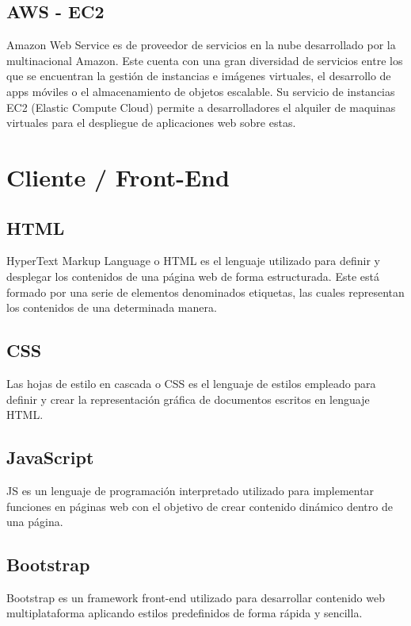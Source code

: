 \subsection{AWS - EC2}
Amazon Web Service\cite{tool:AWS} es de proveedor de servicios en la nube desarrollado por la multinacional Amazon. Este cuenta con una gran diversidad de servicios entre los que se encuentran la gestión de instancias e imágenes virtuales, el desarrollo de apps móviles o el almacenamiento de objetos escalable. Su servicio de instancias EC2 (Elastic Compute Cloud) permite a desarrolladores el alquiler de maquinas virtuales para el despliegue de aplicaciones web sobre estas.

\section{Cliente / Front-End}

\subsection{HTML}
HyperText Markup Language o HTML\cite{tool:HTML} es el lenguaje utilizado para definir y desplegar los contenidos de una página web de forma estructurada. Este está formado por una serie de elementos denominados etiquetas, las cuales representan los contenidos de una determinada manera.

\subsection{CSS}
Las hojas de estilo en cascada o CSS\cite{tool:CSS} es el lenguaje de estilos empleado para definir y crear la representación gráfica de documentos escritos en lenguaje HTML.

\subsection{JavaScript}
JS\cite{tool:JavaScript} es un lenguaje de programación interpretado utilizado para implementar funciones en páginas web con el objetivo de crear contenido dinámico dentro de una página.

\subsection{Bootstrap}
Bootstrap\cite{tool:Bootstrap} es un framework front-end utilizado para desarrollar contenido web multiplataforma aplicando estilos predefinidos de forma rápida y sencilla.


